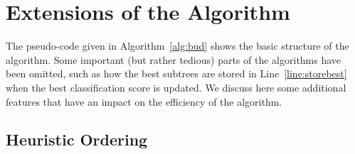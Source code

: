 \documentclass{article}
\begin{document}
%


\section{Extensions of the Algorithm}
\label{sec:ext}

The pseudo-code given in Algorithm~\ref{alg:bud} shows the basic structure of the algorithm. 
Some important (but rather tedious) parts of the algorithms have been omitted, such as how the best subtrees are stored in Line~\ref{line:storebest} when the best classification score is updated.
We discuss here some additional features that have an impact on the efficiency of the algorithm.




\subsection{Heuristic Ordering}
\label{sec:heuristic}
\end{document}

